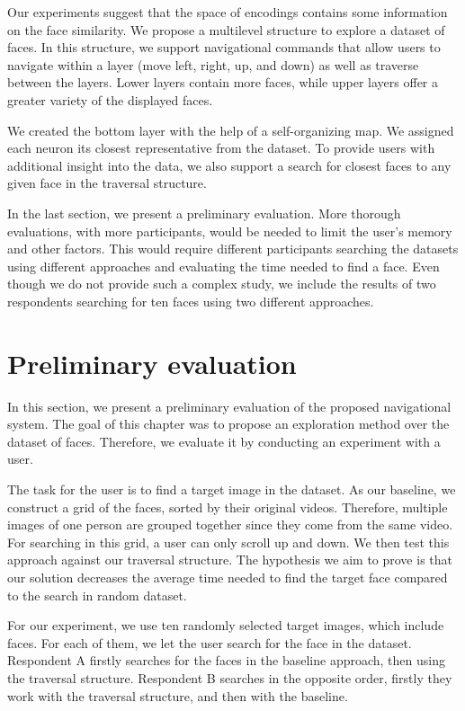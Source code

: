 Our experiments suggest that the space of encodings contains some information on the face similarity. We propose a multilevel structure to explore a dataset of faces. In this structure, we support navigational commands that allow users to navigate within a layer (move left, right, up, and down) as well as traverse between the layers. Lower layers contain more faces, while upper layers offer a greater variety of the displayed faces.

We created the bottom layer with the help of a self-organizing map. We assigned each neuron its closest representative from the dataset. To provide users with additional insight into the data, we also support a search for closest faces to any given face in the traversal structure.

In the last section, we present a preliminary evaluation. More thorough evaluations, with more participants, would be needed to limit the user's memory and other factors. This would require different participants searching the datasets using different approaches and evaluating the time needed to find a face. Even though we do not provide such a complex study, we include the results of two respondents searching for ten faces using two different approaches.

\section{Preliminary evaluation}

In this section, we present a preliminary evaluation of the proposed navigational system. The goal of this chapter was to propose an exploration method over the dataset of faces. Therefore, we evaluate it by conducting an experiment with a user.

The task for the user is to find a target image in the dataset. As our baseline, we construct a grid of the faces, sorted by their original videos. Therefore, multiple images of one person are grouped together since they come from the same video. For searching in this grid, a user can only scroll up and down. We then test this approach against our traversal structure. The hypothesis we aim to prove is that our solution decreases the average time needed to find the target face compared to the search in random dataset.

For our experiment, we use ten randomly selected target images, which include faces. For each of them, we let the user search for the face in the dataset. Respondent A firstly searches for the faces in the baseline approach, then using the traversal structure. Respondent B searches in the opposite order, firstly they work with the traversal structure, and then with the baseline.

